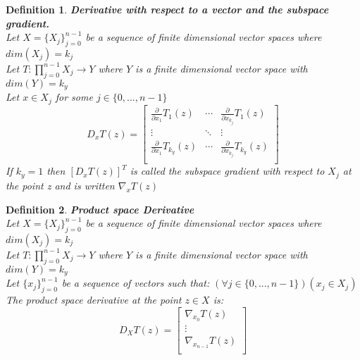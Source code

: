 \documentclass[12pt]{extarticle}
\theoremstyle{plain}
\theoremstyle{Definition}
\newtheorem{def.}{Definition}[section]
\theoremstyle{Definition}
\theoremstyle{plain}
\begin{document}
\begin{def.} \textbf{Derivative with respect to a vector and the subspace gradient.} \\ 
	Let $X = \{X_j\}_{j=0}^{n-1}$ be a sequence of finite dimensional vector spaces where $dim(X_j) = k_j$ \\ 
	Let $T : \prod_{j=0}^{n-1} X_j \to Y$ where $Y$ is a finite dimensional vector space with $dim(Y) = k_y$ \\ 
	Let $x \in X_j$ for some $j \in \{0,...,n-1\}$ \\ 
	\[
	D_x T(z) = 
	\begin{bmatrix}
	\frac{\partial}{\partial x_1} T_1(z) & \cdots & \frac{\partial}{\partial x_{k_j}} T_1(z) \\
	\vdots & \ddots & \vdots \\ 
	\frac{\partial}{\partial x_1} T_{k_y}(z) & \cdots & \frac{\partial}{\partial x_{k_j}} T_{k_y}(z) \\	
	\end{bmatrix}
	\]
	If $k_y = 1$ then $[D_xT(z)]^T$ is called the subspace gradient with respect to $X_j$ at the point z and is written $\nabla_x T(z)$
\end{def.}
\begin{def.} \textbf{Product space Derivative} \\ 
		Let $X = \{X_j\}_{j=0}^{n-1}$ be a sequence of finite dimensional vector spaces where $dim(X_j) = k_j$ \\ 
		Let $T : \prod_{j=0}^{n-1} X_j \to Y$ where $Y$ is a finite dimensional vector space with $dim(Y) = k_y$ \\
		Let $\{x_j\}_{j=0}^{n-1}$ be a sequence of vectors such that: $(\forall j \in \{0,...,n-1\})(x_j \in X_j)$ \\ 
		The product space derivative at the point $z \in X$ is: \\ 
		\[
		D_{X} T(z) = 
		\begin{bmatrix}
		\nabla_{x_0} T(z) \\ 
		\vdots \\ 
		\nabla_{x_{n-1}} T(z) \\ 		
		\end{bmatrix}
		\]
\end{def.}
\end{document}
